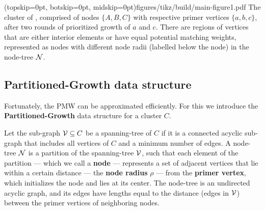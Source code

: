 \Figure[htb](topskip=0pt, botskip=0pt, midskip=0pt){figures/tikz/build/main-figure1.pdf}{
    The cluster of , comprised of nodes $\{A, B, C\}$ with respective primer vertices $\{a, b, c\}$, after two rounds of prioritized growth of $a$ and $c$. There are regions of vertices that are either interior elements or have equal potential matching weights, represented as nodes with different node radii (labelled below the node) in the node-tree $\mathcal{N}$. \label{fig:pmw}}

\subsection{Partitioned-Growth data structure}\label{sec:nodeset}
Fortunately, the PMW can be approximated efficiently. For this we introduce the \textbf{Partitioned-Growth} data structure for a cluster $C$.

Let the sub-graph $\mathcal{V}\subseteq C$ be a spanning-tree of $C$ if it is a connected acyclic sub-graph that includes all vertices of $C$ and a minimum number of edges. A node-tree $\mathcal{N}$ is a partition of the spanning-tree $\mathcal{V}$, such that each element of the partition --- which we call a \textbf{node} --- represents a set of adjacent vertices that lie within a certain distance --- the \textbf{node radius} $\rho$ --- from the \textbf{primer vertex}, which initializes the node and lies at its center. The node-tree is an undirected acyclic graph, and its edges have lengths equal to the distance (edges in $\mathcal{V}$) between the primer vertices of neighboring nodes. 





